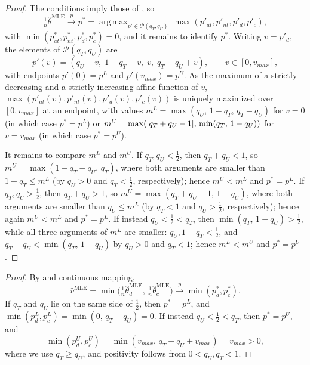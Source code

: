 \documentclass[12pt,reqno]{amsart}
\theoremstyle{theorem}
\theoremstyle{definition}
\newcommand{\0}{\mathbf{0}}
\newcommand{\1}{\mathbf{1}}
\DeclareMathOperator*{\argmax}{arg\,max}
\begin{document}
\mleconvergencesimpler*

\begin{proof}
    The conditions imply those of , so
    \[
        \tfrac{1}{n}\hat{\theta}^{\text{MLE}} \xrightarrow{p} p^* = \argmax_{p' \in \mathcal{P}(q_T,q_U)}\, \max(p'_{at}, p'_{nt}, p'_d, p'_c),
    \]
    with $\min(p^*_{at}, p^*_{nt}, p^*_d, p^*_c) = 0$,
    and it remains to identify $p^*$.
    Writing $v = p'_d$, the elements of $\mathcal{P}(q_T,q_U)$ are
    \[
        p'(v) = (q_U - v,\; 1 - q_T - v,\; v,\; q_T - q_U + v),
        \qquad
        v \in [0, v_{max}],
    \]
    with endpoints $p'(0) = p^L$ and $p'(v_{max}) = p^U$.
    As the maximum of a strictly decreasing and a strictly increasing affine function of $v$, $\max(p'_{at}(v), p'_{nt}(v), p'_d(v), p'_c(v))$ is uniquely maximized over $[0,v_{max}]$ at an endpoint,
    with values $m^L = \max(q_U,\, 1 - q_T,\, q_T - q_U)$ for $v = 0$ (in which case $p^* = p^L$) or $m^U = \max(\lvert q_T + q_U - 1\rvert,\, \min(q_T,\, 1 - q_U))$ for $v = v_{max}$ (in which case $p^* = p^U$).

    It remains to compare $m^L$ and $m^U$.
    If $q_T, q_U < \tfrac{1}{2}$, then $q_T + q_U < 1$, so $m^U = \max(1 - q_T - q_U,\, q_T)$, where both arguments are smaller than $1 - q_T \leq m^L$ (by $q_U > 0$ and $q_T < \tfrac{1}{2}$, respectively); hence $m^U < m^L$ and $p^* = p^L$.
    If $q_T, q_U > \tfrac{1}{2}$, then $q_T + q_U > 1$, so $m^U = \max(q_T + q_U - 1,\, 1 - q_U)$, where both arguments are smaller than $q_U \leq m^L$ (by $q_T < 1$ and $q_U > \tfrac{1}{2}$, respectively); hence again $m^U < m^L$ and $p^* = p^L$.
    If instead $q_U < \tfrac{1}{2} < q_T$, then $\min(q_T,\, 1 - q_U) > \tfrac{1}{2}$, while all three arguments of $m^L$ are smaller: $q_U, 1 - q_T < \tfrac{1}{2}$, and $q_T - q_U < \min(q_T,\, 1 - q_U)$ by $q_U > 0$ and $q_T < 1$; hence $m^L < m^U$ and $p^* = p^U$.
\end{proof}


\mleviolation*

\begin{proof}
    By  and continuous mapping,
    \[
        \hat{v}^{\text{MLE}} = \min\bigl(\tfrac{1}{n}\hat{\theta}^{\text{MLE}}_d,\, \tfrac{1}{n}\hat{\theta}^{\text{MLE}}_c\bigr)
        \xrightarrow{p}
        \min(p^*_d, p^*_c).
    \]
    If $q_T$ and $q_U$ lie on the same side of $\tfrac{1}{2}$, then $p^* = p^L$, and $\min(p^L_d, p^L_c) = \min(0,\, q_T - q_U) = 0$. If instead $q_U < \tfrac{1}{2} < q_T$, then $p^* = p^U$, and
    \[
        \min(p^U_d, p^U_c) = \min(v_{max},\, q_T - q_U + v_{max}) = v_{max} > 0,
    \]
    where we use $q_T \geq q_U$, and positivity follows from $0 < q_U, q_T < 1$.
\end{proof}
\end{document}
